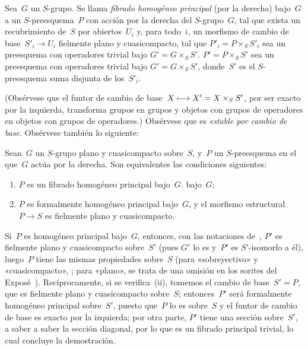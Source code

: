 \begin{definition}
\label{XI.4.1}
Sea~$G$ un $S$-grupo. Se llama \emph{fibrado homogéneo principal} (por la
derecha) bajo~$G$ a un $S$-preesquema~$P$ con acción por la derecha del
$S$-grupo~$G$, tal que exista un recubrimiento de~$S$ por abiertos~$U_i$ y,
para todo~$i$, un morfismo de cambio de base~$S'_i\to U_i$ fielmente plano y
cuasicompacto, tal que
{$P'_i=P\times_S S'_i$ sea un preesquema con operadores trivial bajo
$G'=G\times_S S'$.}
{$P'=P\times_S S'$ sea un preesquema con operadores trivial bajo
$G'=G\times_S S'$, donde~$S'$ es el $S$-preesquema suma disjunta de los~$S'_i$.}
\end{definition}

(Obsérvese que el funtor de cambio de base~$X\longmapsto X'=X\times_S S'$,
por ser exacto por la izquierda, transforma grupos en grupos y objetos con
grupos de operadores en objetos con grupos de operadores.) Obsérvese que
 es \emph{estable por cambio de base}. Obsérvese también lo
siguiente:

\begin{proposition}
\label{XI.4.2}
Sean~$G$ un $S$-grupo plano y cuasicompacto sobre~$S$, y~$P$ un
$S$-preesquema en el que~$G$ actúa por la derecha. Son equivalentes las
condiciones siguientes:
\begin{enumerate}
\item[(i)] $P$ es un fibrado homogéneo principal
{bajo~$G$.}
{bajo~$G$;}
\item[(ii)] $P$ es formalmente homogéneo principal bajo~$G$,
%
y el morfismo estructural~$P\to S$ es fielmente plano y cuasicompacto.
\end{enumerate}
\end{proposition}

Si~$P$ es homogéneo principal bajo~$G$, entonces, con las notaciones
de~, $P'$ es fielmente plano y cuasicompacto sobre~$S'$ (pues
$G'$ lo es y~$P'$ es $S'$-isomorfo a él), luego~$P$ tiene las mismas
propiedades sobre~$S$ (para «sobreyectivo» y «cuasicompacto», \cf
{}; para «plano», se trata de una omisión en los sorites del
Exposé~). Recíprocamente, si se verifica~(ii), tomemos el cambio de
base~$S'=P$, que es fielmente plano y cuasicompacto sobre~$S$; entonces~$P'$
será formalmente homogéneo principal sobre~$S'$, puesto que~$P$ lo es
sobre~$S$ y el funtor de cambio de base es exacto por la izquierda; por otra
parte, $P'$ tiene una sección sobre~$S'$,
{a saber}
{a saber}
la sección diagonal, por lo que es un fibrado principal trivial, lo cual
concluye la demostración.

